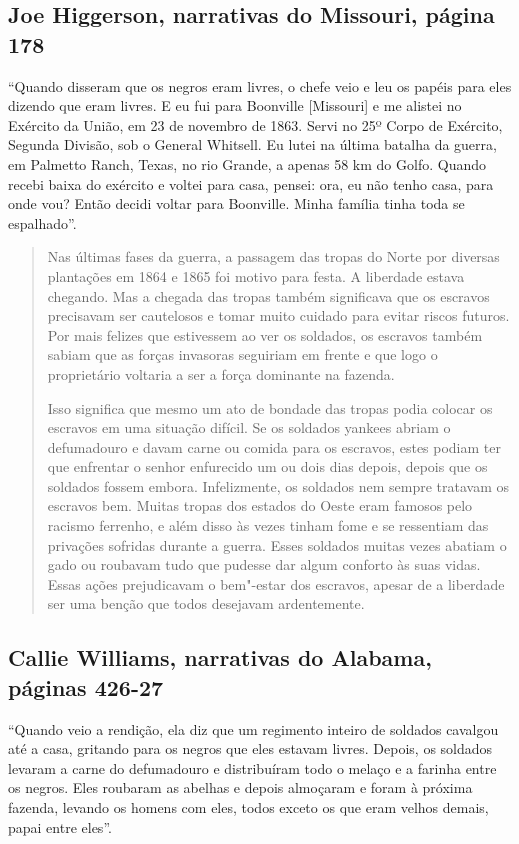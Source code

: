 \subsection{Joe Higgerson, narrativas do Missouri, página 178}
\label{ref144}

``Quando disseram que os negros eram livres, o chefe veio e leu os
papéis para eles dizendo que eram livres. E eu fui para Boonville
{[}Missouri{]} e me alistei no Exército da União, em 23 de novembro de
1863. Servi no 25º Corpo de Exército, Segunda Divisão, sob o General
Whitsell. Eu lutei na última batalha da guerra, em Palmetto Ranch,
Texas, no rio Grande, a apenas 58 km do Golfo. Quando recebi baixa do
exército e voltei para casa, pensei: ora, eu não tenho casa, para onde
vou? Então decidi voltar para Boonville. Minha família tinha toda se
espalhado''.

\begin{quote}
Nas últimas fases da guerra, a passagem das tropas do Norte por
diversas plantações em 1864 e 1865 foi motivo para festa. A liberdade
estava chegando. Mas a chegada das tropas também significava que os
escravos precisavam ser cautelosos e tomar muito cuidado para evitar
riscos futuros. Por mais felizes que estivessem ao ver os soldados, os
escravos também sabiam que as forças invasoras seguiriam em frente e que
logo o proprietário voltaria a ser a força dominante na fazenda.

Isso significa que mesmo um ato de bondade das tropas podia
colocar os escravos em uma situação difícil. Se os soldados yankees
abriam o defumadouro e davam carne ou comida para os escravos, estes
podiam ter que enfrentar o senhor enfurecido um ou dois dias depois,
depois que os soldados fossem embora. Infelizmente, os soldados nem
sempre tratavam os escravos bem. Muitas tropas dos estados do Oeste eram
famosos pelo racismo ferrenho, e além disso às vezes tinham fome e se
ressentiam das privações sofridas durante a guerra. Esses soldados
muitas vezes abatiam o gado ou roubavam tudo que pudesse dar algum
conforto às suas vidas. Essas ações prejudicavam o bem"-estar dos
escravos, apesar de a liberdade ser uma benção que todos desejavam
ardentemente.
\end{quote}

\subsection{Callie Williams, narrativas do Alabama, páginas 426-27}
\label{ref290}

``Quando veio a rendição, ela diz que um regimento inteiro de soldados
cavalgou até a casa, gritando para os negros que eles estavam livres.
Depois, os soldados levaram a carne do defumadouro e distribuíram todo o
melaço e a farinha entre os negros. Eles roubaram as abelhas e depois
almoçaram e foram à próxima fazenda, levando os homens com eles, todos
exceto os que eram velhos demais, papai entre eles''.

